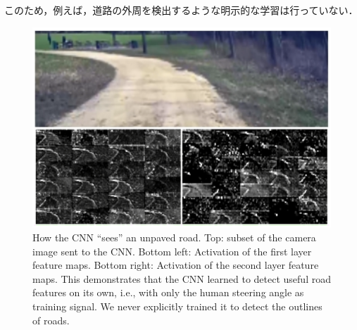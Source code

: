 このため，例えば，道路の外周を検出するような明示的な学習は行っていない．
     \begin{figure}[h]
          \centering
          \includegraphics[keepaspectratio, scale=0.35] {images/bojarski_CNN.png}
          \captionsetup{justification=raggedright} %
          \caption{How the CNN ``sees'' an unpaved road. Top: subset of the camera image sent to the CNN. Bottom left: Activation of the first layer feature maps. Bottom right: Activation of the second layer feature maps. This demonstrates that the CNN learned to detect useful road features on its own, i.e., with only the human steering angle as training signal. We never explicitly trained it to detect the outlines of roads. \cite{bojarski}}
          \label{Fig:bojarski_CNN}
     \end{figure}
\newpage
